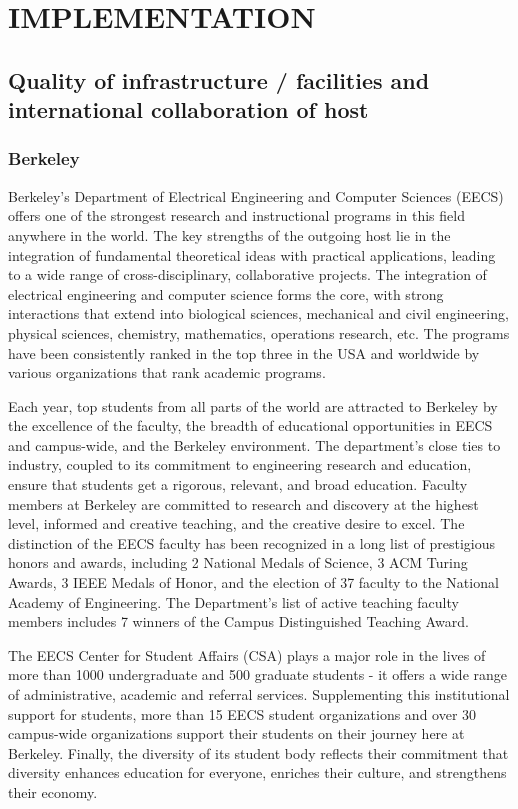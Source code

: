\section{IMPLEMENTATION} %
\label{sec:implementation}
\subsection{Quality of infrastructure / facilities and international collaboration of host} 
\subsubsection{Berkeley}
Berkeley's Department of  Electrical Engineering and Computer Sciences
(EECS) offers one of the strongest research and instructional programs
in this field anywhere in the world. The key strengths of the outgoing
host  lie in  the integration  of fundamental  theoretical  ideas with
practical applications, leading to a wide range of cross-disciplinary,
collaborative projects. The  integration of electrical engineering and
computer science forms the  core, with strong interactions that extend
into biological  sciences, mechanical and  civil engineering, physical
sciences,  chemistry,  mathematics,   operations  research,  etc.  The
programs have been consistently ranked in the top three in the USA and
worldwide by various organizations that rank academic programs.

Each year, top  students from all parts of the  world are attracted to
Berkeley by the excellence of  the faculty, the breadth of educational
opportunities   in   EECS    and   campus-wide,   and   the   Berkeley
environment. The  department's close ties to industry,  coupled to its
commitment to engineering research and education, ensure that students
get  a rigorous,  relevant, and  broad education.  Faculty  members at
Berkeley are committed to research and discovery at the highest level,
informed and creative teaching, and  the creative desire to excel. The
distinction of the EECS faculty has  been recognized in a long list of
prestigious honors and awards, including 2 National Medals of Science,
3 ACM  Turing Awards, 3 IEEE Medals  of Honor, and the  election of 37
faculty to the National  Academy of Engineering. The Department's list
of active  teaching faculty members  includes 7 winners of  the Campus
Distinguished Teaching Award.

The EECS  Center for Student Affairs  (CSA) plays a major  role in the
lives of more  than 1000 undergraduate and 500  graduate students - it
offers  a   wide  range  of  administrative,   academic  and  referral
services. Supplementing this  institutional support for students, more
than   15  EECS   student  organizations   and  over   30  campus-wide
organizations  support   their  students   on  their  journey   here  at
Berkeley.  Finally, the  diversity of  its student  body  reflects their
commitment  that diversity enhances  education for  everyone, enriches
their culture, and strengthens their economy.

